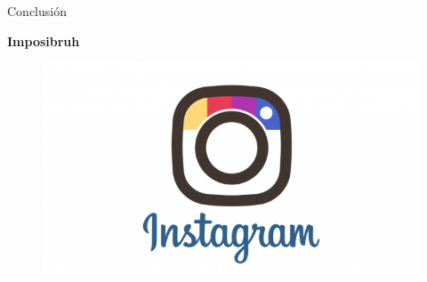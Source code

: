 \begin{frame}[t,fragile]{Conclusión}

\textbf{Imposibruh}



\begin{figure}[!h]
    \centering
    \includegraphics[scale=0.45]{instagram-logo.png}
    \label{fig:my_label}
    \end{figure}

\end{frame}

